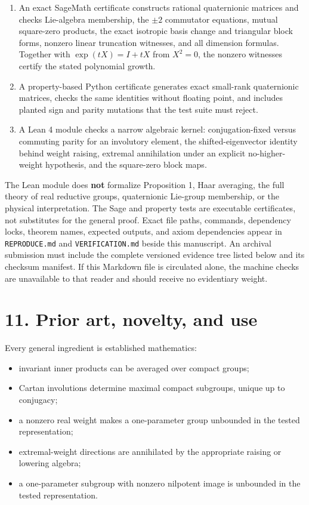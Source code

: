 \documentclass[
  10pt,
  letterpaper,
  oneside]{scrartcl}
\providecommand{\tightlist}{%
  \setlength{\itemsep}{0pt}\setlength{\parskip}{0pt}}
\begin{document}
\begin{enumerate}
\def\labelenumi{\arabic{enumi}.}
\tightlist
\item
  An exact SageMath certificate constructs rational quaternionic
  matrices and checks Lie-algebra membership, the \(\pm2\) commutator
  equations, mutual square-zero products, the exact isotropic basis
  change and triangular block forms, nonzero linear truncation
  witnesses, and all dimension formulas. Together with \(\exp(tX)=I+tX\)
  from \(X^2=0\), the nonzero witnesses certify the stated polynomial
  growth.
\item
  A property-based Python certificate generates exact small-rank
  quaternionic matrices, checks the same identities without floating
  point, and includes planted sign and parity mutations that the test
  suite must reject.
\item
  A Lean 4 module checks a narrow algebraic kernel: conjugation-fixed
  versus commuting parity for an involutory element, the
  shifted-eigenvector identity behind weight raising, extremal
  annihilation under an explicit no-higher- weight hypothesis, and the
  square-zero block maps.
\end{enumerate}

The Lean module does \textbf{not} formalize Proposition 1, Haar
averaging, the full theory of real reductive groups, quaternionic
Lie-group membership, or the physical interpretation. The Sage and
property tests are executable certificates, not substitutes for the
general proof. Exact file paths, commands, dependency locks, theorem
names, expected outputs, and axiom dependencies appear in
\texttt{REPRODUCE.md} and \texttt{VERIFICATION.md} beside this
manuscript. An archival submission must include the complete versioned
evidence tree listed below and its checksum manifest. If this Markdown
file is circulated alone, the machine checks are unavailable to that
reader and should receive no evidentiary weight.

\section{11. Prior art, novelty, and
use}\label{prior-art-novelty-and-use}

Every general ingredient is established mathematics:

\begin{itemize}
\tightlist
\item
  invariant inner products can be averaged over compact groups;
\item
  Cartan involutions determine maximal compact subgroups, unique up to
  conjugacy;
\item
  a nonzero real weight makes a one-parameter group unbounded in the
  tested representation;
\item
  extremal-weight directions are annihilated by the appropriate raising
  or lowering algebra;
\item
  a one-parameter subgroup with nonzero nilpotent image is unbounded in
  the tested representation.
\end{itemize}
\end{document}
